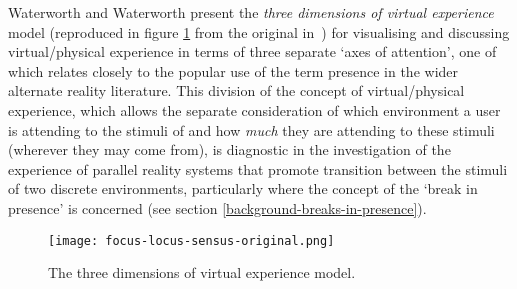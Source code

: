 \newcommand{\absencefootnote}{\footnote{\textbf{Absence} is defined as \textit{``a psychological focus on \ldots\ conceptual processing''}~\cite{Waterworth2001}, as \textit{``presence in an exclusively mental activity''}~\cite{Giuseppe2014}, with total presence (in the above definition) and total absence representing opposite poles along the continuum of the focus of attention axis~\cite{Mantovani2010}.}}

Waterworth and Waterworth present the \textit{three dimensions of virtual experience} model (reproduced in figure \ref{focus-locus-sensus-original} from the original in~\cite{Waterworth2001}) for visualising and discussing virtual/physical experience in terms of three separate `axes of attention', one of which relates closely to the popular use of the term presence in the wider alternate reality literature. This division of the concept of virtual/physical experience, which allows the separate consideration of which environment a user is attending to the stimuli of and how \textit{much} they are attending to these stimuli (wherever they may come from), is diagnostic in the investigation of the experience of parallel reality systems that promote transition between the stimuli of two discrete environments, particularly where the concept of the `break in presence' is concerned (see section \ref{background-breaks-in-presence}).

\begin{figure}[h]
	\begin{center}
		\texttt{[image: focus-locus-sensus-original.png]}
		\caption{The three dimensions of virtual experience model.}
		\label{focus-locus-sensus-original}
	\end{center}	
\end{figure}

